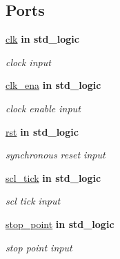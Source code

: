 \subsection*{Ports}
 \begin{DoxyCompactItemize}
\item 
\hyperlink{classstop__generator_a4a4609c199d30b3adebbeb3a01276ec5}{clk}  {\bfseries {\bfseries \textcolor{vhdlchar}{in}\textcolor{vhdlchar}{ }}} {\bfseries \textcolor{vhdlchar}{std\+\_\+logic}\textcolor{vhdlchar}{ }} 
\begin{DoxyCompactList}\small\item\em clock input \end{DoxyCompactList}\item 
\hyperlink{classstop__generator_a373faa4fdd1aebdfb0b95d5d53da4434}{clk\+\_\+ena}  {\bfseries {\bfseries \textcolor{vhdlchar}{in}\textcolor{vhdlchar}{ }}} {\bfseries \textcolor{vhdlchar}{std\+\_\+logic}\textcolor{vhdlchar}{ }} 
\begin{DoxyCompactList}\small\item\em clock enable input \end{DoxyCompactList}\item 
\hyperlink{classstop__generator_ae0366c76519a377d49a533f4eff582ad}{rst}  {\bfseries {\bfseries \textcolor{vhdlchar}{in}\textcolor{vhdlchar}{ }}} {\bfseries \textcolor{vhdlchar}{std\+\_\+logic}\textcolor{vhdlchar}{ }} 
\begin{DoxyCompactList}\small\item\em synchronous reset input \end{DoxyCompactList}\item 
\hyperlink{classstop__generator_ad9d06ff2f81f48b03857f1a38ce130d6}{scl\+\_\+tick}  {\bfseries {\bfseries \textcolor{vhdlchar}{in}\textcolor{vhdlchar}{ }}} {\bfseries \textcolor{vhdlchar}{std\+\_\+logic}\textcolor{vhdlchar}{ }} 
\begin{DoxyCompactList}\small\item\em scl tick input \end{DoxyCompactList}\item 
\hyperlink{classstop__generator_ae5b5aaf8947a9de595b67e0f57b9e9a3}{stop\+\_\+point}  {\bfseries {\bfseries \textcolor{vhdlchar}{in}\textcolor{vhdlchar}{ }}} {\bfseries \textcolor{vhdlchar}{std\+\_\+logic}\textcolor{vhdlchar}{ }} 
\begin{DoxyCompactList}\small\item\em stop point input \end{DoxyCompactList}\item 

\end{DoxyCompactItemize}
